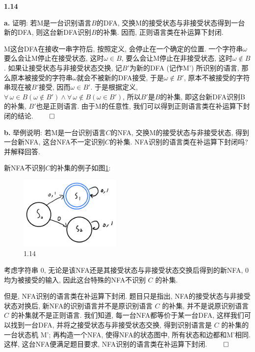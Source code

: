 \documentclass[UTF8]{report}
\newcommand{\problem}[1]{{\setlength{\parskip}{10pt}\noindent \bf{#1}}}
\renewenvironment{proof}{{\setlength{\parskip}{7pt}\noindent\hskip 2em \bf 证明 \quad}}{\hfill$\qed$\par}
\begin{document}
\problem{1.14} 

\problem{a.} 证明: 若M是一台识别语言$B$的DFA, 交换M的接受状态与非接受状态得到一台新的DFA, 则这台新DFA识别$B$的补集. 因而, 正则语言类在补运算下封闭.

\begin{proof}
    M这台DFA在接收一串字符后, 按照定义, 会停止在一个确定的位置. 一个字符串$\omega$要么会让M停止在接受状态, 这时$\omega \in B$, 要么会让M停止在非接受状态, 这时$\omega \notin B$. 如果让接受状态与非接受状态交换, 记$B'$为新的DFA (记作M') 所识别的语言, 那么原本被接受的字符串$\omega$就会不被新的DFA接受, 于是$\omega \notin B'$, 原本不被接受的字符串现在被$B'$接受, 因而$\omega \in B'$. 于是根据定义, $\forall\,\omega\in B (\omega \notin B') \land \forall\,\omega\notin B (\omega \in B')$, 所以$B'$是$B$的补集, 即这台新DFA识别B的补集, $B'$也是正则语言. 由于M的任意性, 我们可以得到正则语言类在补运算下封闭的结论.
\end{proof}
    
\problem{b.} 举例说明: 若M是一台识别语言$C$的NFA, 交换M的接受状态与非接受状态, 得到一台新NFA, 这台NFA不一定识别$C$的补集. NFA识别的语言类在补运算下封闭吗? 并解释回答.

\begin{proof}
    新NFA不识别$C$的补集的例子如图\ref{fig:1_14b}:
    
    \begin{figure}[!htbp]
        \centering
        \includegraphics[width=5cm]{image/1.14.png}
        \caption{1.14}
        \label{fig:1_14b}
    \end{figure}
    
    考虑字符串 $0$, 无论是该NFA还是其接受状态与非接受状态交换后得到的新NFA, $0$ 均为被接受的输入, 因此这台特殊的NFA不识别 $C$ 的补集.
    
    但是, NFA识别的语言类在补运算下封闭. 题目只是指出, NFA的接受状态与非接受状态对换后, 新NFA的识别语言并不是原识别语言 $C$ 的补集, 并不是说原识别语言 $C$ 的补集就不是正则语言. 我们知道, 每一台NFA都等价于某一台DFA, 这样我们可以找到一台DFA, 并将之接受状态与非接受状态交换, 得到识别语言是 $C$ 的补集的一台状态机 M'; 再构造一个NFA, 使得NFA的状态图中, 所有状态和边都和M'相同. 这样, 这台NFA便满足题目要求, NFA识别的语言类在补运算下封闭.
\end{proof}
\end{document}
